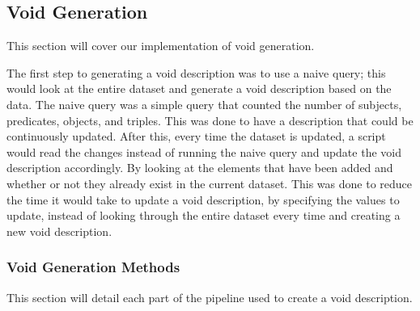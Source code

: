 \subsection{Void Generation}\label{sec:void}
This section will cover our implementation of void generation.

The first step to generating a \gls{void} description was to use a naive query; this would look at the entire dataset and generate a \gls{void} description based on the data. The naive query was a simple query that counted the number of subjects, predicates, objects, and triples. This was done to have a description that could be continuously updated. After this, every time the dataset is updated, a script would read the changes instead of running the naive query and update the \gls{void} description accordingly. By looking at the elements that have been added and whether or not they already exist in the current dataset. This was done to reduce the time it would take to update a \gls{void} description, by specifying the values to update, instead of looking through the entire dataset every time and creating a new \gls{void} description.

\subsubsection{Void Generation Methods}\label{sec:voidmethods}
This section will detail each part of the pipeline used to create a void description.







